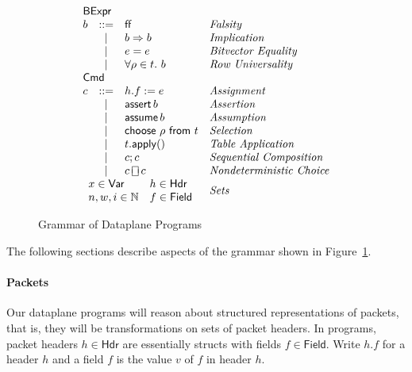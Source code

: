 \documentclass{article}
\newcommand{\FALSE}{\mathsf{ff}}
\newcommand{\BExpr}{\mathsf{BExpr}}
\newcommand{\Cmd}{\mathsf{Cmd}}
\newcommand{\Hdr}{\mathsf{Hdr}}
\newcommand{\Field}{\mathsf{Field}}
\newcommand{\Var}{\mathsf{Var}}
\newcommand{\assert}{\mathop{\mathsf{assert}}}
\newcommand{\assume}{\mathop{\mathsf{assume}}}
\newcommand{\apply}{\mathsf{apply}}
\newcommand{\choiceop}{\rotatebox[origin=c]{90}{$\sqsubset\!\!\!\sqsupset$}}
\newcommand{\choice}{\mathbin{\choiceop}}
\renewcommand{\choose}[2]{\mathsf{choose}~#1~\mathsf{from}~#2}
\begin{document}
\begin{figure}[htp]
\[\begin{array}{lcll}
    \multicolumn{3}{l}{\BExpr} \\
    b & ::= & \FALSE  & \textit{Falsity}\\
      & \mid & b \Rightarrow b & \textit{Implication} \\
      & \mid & e = e & \textit{Bitvector Equality}\\
    & \mid & \forall \rho \in t.~b & \textit{Row Universality}\\
    \multicolumn{3}{l}{\Cmd} \\
    c & ::=  & h.f := e & \textit{Assignment}\\
      & \mid & \assert b & \textit{Assertion}\\
      & \mid & \assume b & \textit{Assumption}\\
      & \mid & \choose \rho t & \textit{Selection} \\
      & \mid & t.\apply() & \textit{Table Application}\\
      & \mid & c;c & \textit{Sequential Composition} \\
    & \mid & c \choice c & \textit{Nondeterministic Choice}\\
    \multicolumn{3}{l}{
      \begin{array}{ll}
        x \in \Var & h \in \Hdr\\
        n,w,i \in \mathbb{N} & f \in \Field
    \end{array}} & \textit{Sets }\\
  \end{array}
\]
\caption{Grammar of Dataplane Programs}
\label{fig:grammar}
\end{figure}

The following sections describe aspects of the grammar shown in Figure~\ref{fig:grammar}.

\paragraph{Packets}
Our dataplane programs will reason about structured representations of packets,
that is, they will be transformations on sets of packet headers. In programs,
packet headers $h \in \Hdr$ are essentially structs with fields $f \in
\Field$. Write $h.f$ for a header $h$ and a field $f$ is the value $v$ of $f$
in header $h$.
\end{document}
